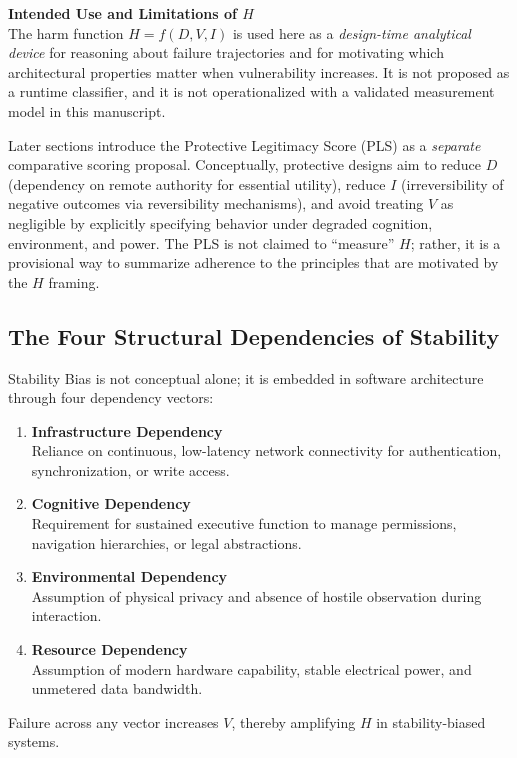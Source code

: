 \documentclass[12pt]{article}
\begin{document}
\textbf{Intended Use and Limitations of $H$}\\
The harm function $H = f(D, V, I)$ is used here as a \emph{design-time analytical device} for reasoning about failure trajectories and for motivating which architectural properties matter when vulnerability increases. It is not proposed as a runtime classifier, and it is not operationalized with a validated measurement model in this manuscript.

Later sections introduce the Protective Legitimacy Score (PLS) as a \emph{separate} comparative scoring proposal. Conceptually, protective designs aim to reduce $D$ (dependency on remote authority for essential utility), reduce $I$ (irreversibility of negative outcomes via reversibility mechanisms), and avoid treating $V$ as negligible by explicitly specifying behavior under degraded cognition, environment, and power. The PLS is not claimed to ``measure'' $H$; rather, it is a provisional way to summarize adherence to the principles that are motivated by the $H$ framing.

\subsection{The Four Structural Dependencies of Stability}
Stability Bias is not conceptual alone; it is embedded in software architecture through four dependency vectors:

\begin{enumerate}
\item \textbf{Infrastructure Dependency}\\
   Reliance on continuous, low-latency network connectivity for authentication, synchronization, or write access.
\item \textbf{Cognitive Dependency}\\
   Requirement for sustained executive function to manage permissions, navigation hierarchies, or legal abstractions.
\item \textbf{Environmental Dependency}\\
   Assumption of physical privacy and absence of hostile observation during interaction.
\item \textbf{Resource Dependency}\\
   Assumption of modern hardware capability, stable electrical power, and unmetered data bandwidth.
\end{enumerate}

Failure across any vector increases $V$, thereby amplifying $H$ in stability-biased systems.
\end{document}

